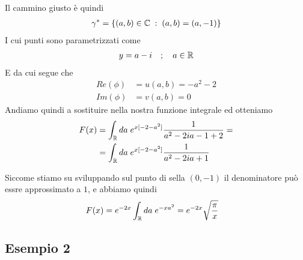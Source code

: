 Il cammino giusto è quindi 
\begin{align}
	\gamma^*= \left\{ (a,b) \in \mathbb{C} \; : \; (a,b) = (a,-1) \right\}
\end{align}
I cui punti sono parametrizzati come
\begin{align}
	y= a - i \quad ; \quad a \in \mathbb{R}
\end{align}
E da cui segue che
\begin{align}
	Re(\phi) &= u(a,b) = -a^2 - 2 \\
	Im (\phi) &=v(a,b) = 0
\end{align}
Andiamo quindi a sostituire nella nostra funzione integrale ed otteniamo
\begin{align}
	F(x) &= \int_{\mathbb{R}} da \; e^{x[-2-a^2]} \frac{1}{a^2 -2ia -1 + 2} =\nonumber\\
	&= \int_{\mathbb{R}} da \; e^{x[-2-a^2]} \frac{1}{a^2 -2ia +1} 
\end{align}

Siccome stiamo su sviluppando sul punto di sella $(0,-1)$ il denominatore può essre approssimato a $1$, e abbiamo quindi
\begin{align}
	F(x) &= e^{-2x}\int_{\mathbb{R}} da \; e^{-xa^2} = e^{-2x} \sqrt{\frac{\pi}{x}}
\end{align}

\newpage

\subsection{Esempio 2}


